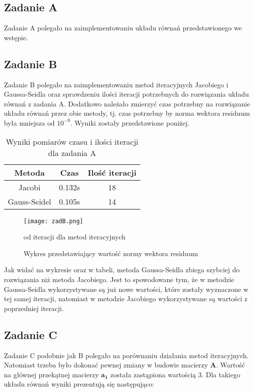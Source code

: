 \documentclass{article}
\begin{document}
\subsection{Zadanie A}
Zadanie A polegało na zaimplementowaniu układu równań przedstawionego we
wstępie.
\subsection{Zadanie B}
Zadanie B polegało na zaimplementowaniu metod iteracyjnych Jacobiego i 
Gaussa-Seidla oraz sprawdzeniu ilości iteracji potrzebnych do rozwiązania
układu równań z zadania A. Dodatkowo należało zmierzyć czas potrzebny na
rozwiązanie układu równań przez obie metody, tj. czas potrzebny by norma
wektora residuum była mniejsza od $10^{-9}$.
Wyniki zostały przedstawione poniżej.

\begin{table}[H]
    \begin{center}
        \begin{tabular}{| c | c | c |} 
        \hline
        Metoda & Czas & Ilość iteracji \\
        \hline
        Jacobi & 0.132s & 18 \\
        \hline
        Gauss-Seidel & 0.105s & 14 \\
        \hline
        \end{tabular}
        \caption{Wyniki pomiarów czasu i ilości iteracji dla zadania A}
    \end{center}
\end{table}

\begin{figure}[H]
    \texttt{[image: zadB.png]}
    \centering
    \caption{Wykres przedstawiający wartość normy wektora residuum}
    {od iteracji dla metod iteracyjnych}
\end{figure}

Jak widać na wykresie oraz w tabeli, metoda Gaussa-Seidla zbiega szybciej do
rozwiązania niż metoda Jacobiego. Jest to spowodowane tym, że w metodzie
Gaussa-Seidla wykorzystywane są już nowe wartości, które zostały wyznaczone
w tej samej iteracji, natomiast w metodzie Jacobiego wykorzystywane są
wartości z poprzedniej iteracji.

\subsection{Zadanie C}
Zadanie C podobnie jak B polegało na porównaniu działania metod iteracyjnych.
Natomiast trzeba było dokonać pewnej zmiany w budowie macierzy $\boldsymbol{A}$.
Wartość na głównej przekątnej macierzy $\boldsymbol{a_1}$ została zastąpiona
wartością 3. Dla takiego układu równań wyniki prezentują się następująco:
\end{document}
